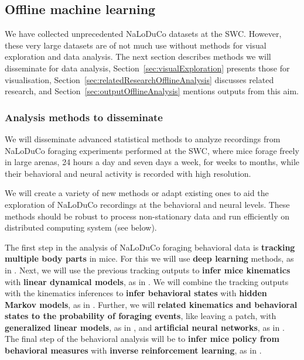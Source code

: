 \documentclass[12pt]{article}
\begin{document}
\subsection{Offline machine learning}

We have collected unprecedented NaLoDuCo datasets at the SWC. However, these
very large datasets are of not much use without methods for visual exploration
and data analysis. The next section describes methods we will disseminate for
data analysis, Section~\ref{sec:visualExploration} presents those for
visualisation, Section~\ref{sec:relatedResearchOfflineAnalysis} discusses
related research, and Section~\ref{sec:outputOfflineAnalysis} mentions outputs
from this aim.

\subsubsection{Analysis methods to disseminate}

We will disseminate advanced statistical methods to analyze recordings from NaLoDuCo
foraging experiments performed at the SWC, where mice forage freely in large
arenas, 24 hours a day and seven days a week, for weeks to months, while their
behavioral and neural activity is recorded with high resolution.

We will create a variety of new methods or adapt existing ones to aid the
exploration of NaLoDuCo recordings at the behavioral and neural levels. These
methods should be robust to process non-stationary data and run efficiently on
distributed computing system (see below).

The first step in the analysis of NaLoDuCo foraging behavioral data is
\textbf{tracking multiple body parts} in mice. For this we will use
\textbf{deep learning} methods, as in
\citep{https://pubmed.ncbi.nlm.nih.gov/30127430/}.
%
Next, we will use the previous tracking outputs to \textbf{infer mice
kinematics} with \textbf{linear dynamical models}, as in
\citep{https://github.com/joacorapela/lds}.
%
We will combine the tracking outputs with the kinematics inferences to
\textbf{infer behavioral states} with \textbf{hidden Markov models}, as in
\citep{https://pubmed.ncbi.nlm.nih.gov/26687221/}.
%
Further, we will \textbf{related kinematics and behavioral states to the
probability of foraging events}, like leaving a patch, with \textbf{generalized
linear models}, as in \citep{}, and \textbf{artificial neural networks}, as in \citep{}.
%
The final step of the behavioral analysis will be to \textbf{infer mice policy
from behavioral measures} with \textbf{inverse reinforcement learning}, as in
\cite{https://arxiv.org/abs/2311.13870v2}.
\end{document}
